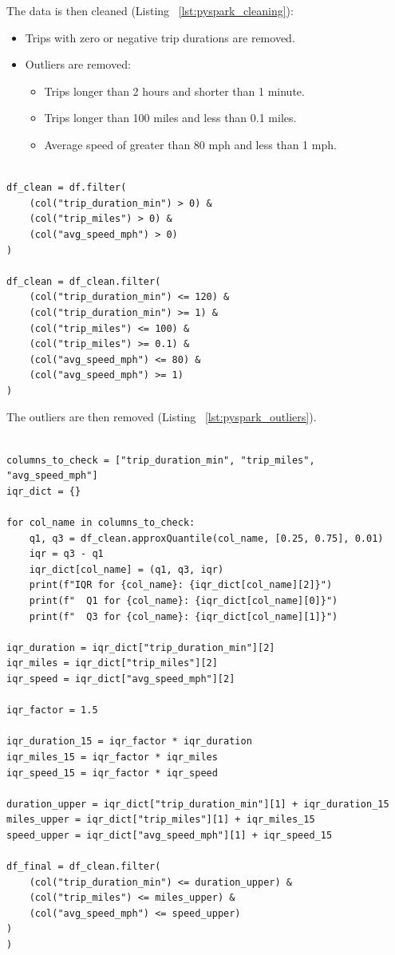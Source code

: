 \documentclass{article}
\begin{document}
The data is then cleaned (Listing ~\ref{lst:pyspark_cleaning}):
\begin{itemize}
    \item Trips with zero or negative trip durations are removed.
    \item Outliers are removed: \begin{itemize}
        \item Trips longer than 2 hours and shorter than 1 minute.
        \item Trips longer than 100 miles and less than 0.1 miles.
        \item Average speed of greater than 80 mph and less than 1 mph.
    \end{itemize}
    
\end{itemize}

\begin{lstlisting}[style=pystyle, caption={Data cleaning code}, label={lst:pyspark_cleaning}]

df_clean = df.filter(
    (col("trip_duration_min") > 0) &
    (col("trip_miles") > 0) &
    (col("avg_speed_mph") > 0)
)

df_clean = df_clean.filter(
    (col("trip_duration_min") <= 120) &
    (col("trip_duration_min") >= 1) &
    (col("trip_miles") <= 100) &
    (col("trip_miles") >= 0.1) &
    (col("avg_speed_mph") <= 80) &
    (col("avg_speed_mph") >= 1)
)
\end{lstlisting}

The outliers are then removed (Listing ~\ref{lst:pyspark_outliers}).

\begin{lstlisting}[style=pystyle, caption={Removing outliers code}, label={lst:pyspark_outliers}]

columns_to_check = ["trip_duration_min", "trip_miles", "avg_speed_mph"]
iqr_dict = {}

for col_name in columns_to_check:
    q1, q3 = df_clean.approxQuantile(col_name, [0.25, 0.75], 0.01)
    iqr = q3 - q1
    iqr_dict[col_name] = (q1, q3, iqr)
    print(f"IQR for {col_name}: {iqr_dict[col_name][2]}")
    print(f"  Q1 for {col_name}: {iqr_dict[col_name][0]}")
    print(f"  Q3 for {col_name}: {iqr_dict[col_name][1]}")

iqr_duration = iqr_dict["trip_duration_min"][2]
iqr_miles = iqr_dict["trip_miles"][2]
iqr_speed = iqr_dict["avg_speed_mph"][2]

iqr_factor = 1.5

iqr_duration_15 = iqr_factor * iqr_duration
iqr_miles_15 = iqr_factor * iqr_miles
iqr_speed_15 = iqr_factor * iqr_speed

duration_upper = iqr_dict["trip_duration_min"][1] + iqr_duration_15
miles_upper = iqr_dict["trip_miles"][1] + iqr_miles_15
speed_upper = iqr_dict["avg_speed_mph"][1] + iqr_speed_15

df_final = df_clean.filter(
    (col("trip_duration_min") <= duration_upper) &
    (col("trip_miles") <= miles_upper) &
    (col("avg_speed_mph") <= speed_upper)
)
)
\end{lstlisting}
\end{document}
